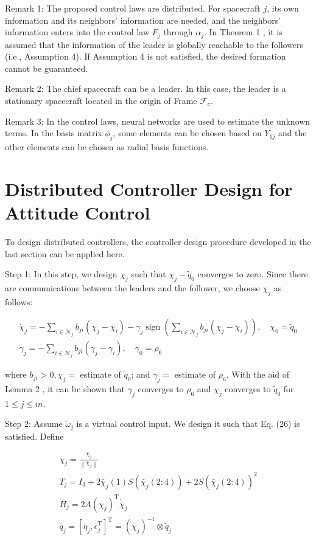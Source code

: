 \documentclass[10pt]{article}
\begin{document}
Remark 1: The proposed control laws are distributed. For spacecraft $j$, its own information and its neighbors' information are needed, and the neighbors' information enters into the control law $F_{j}$ through $\alpha_{j}$. In Theorem 1 , it is assumed that the information of the leader is globally reachable to the followers (i.e., Assumption 4). If Assumption 4 is not satisfied, the desired formation cannot be guaranteed.

Remark 2: The chief spacecraft can be a leader. In this case, the leader is a stationary spacecraft located in the origin of Frame $\mathcal{F}_{c}$.

Remark 3: In the control laws, neural networks are used to estimate the unknown terms. In the basis matrix $\phi_{j}$, some elements can be chosen based on $Y_{1 j}$ and the other elements can be chosen as radial basis functions.

\section{Distributed Controller Design for Attitude Control}
To design distributed controllers, the controller design procedure developed in the last section can be applied here.

Step 1: In this step, we design $\chi_{j}$ such that $\chi_{j}-\tilde{q}_{0}$ converges to zero. Since there are communications between the leaders and the follower, we choose $\chi_{j}$ as follows:

$$
\begin{gathered}
\dot{\chi}_{j}=-\sum_{i \in \mathcal{N}_{j}} b_{j i}\left(\chi_{j}-\chi_{i}\right)-\gamma_{j} \operatorname{sign}\left(\sum_{i \in \mathcal{N}_{j}} b_{j i}\left(\chi_{j}-\chi_{i}\right)\right), \quad \chi_{0}=\tilde{q}_{0} \\
\dot{\gamma}_{j}=-\sum_{i \in \mathcal{N}_{j}} b_{j i}\left(\gamma_{j}-\gamma_{i}\right), \quad \gamma_{0}=\rho_{6}
\end{gathered}
$$

where $b_{j i}>0, \chi_{j}=$ estimate of $\tilde{q}_{0}$; and $\gamma_{j}=$ estimate of $\rho_{6}$. With the aid of Lemma 2 , it can be shown that $\gamma_{j}$ converges to $\rho_{6}$ and $\chi_{j}$ converges to $\tilde{q}_{0}$ for $1 \leq j \leq m$.

Step 2: Assume $\tilde{\omega}_{j}$ is a virtual control input. We design it such that Eq. (26) is satisfied. Define

$$
\begin{gathered}
\bar{\chi}_{j}=\frac{\chi_{j}}{\left\|\chi_{j}\right\|} \\
T_{j}=I_{3}+2 \bar{\chi}_{j}(1) S\left(\bar{\chi}_{j}(2: 4)\right)+2 S\left(\bar{\chi}_{j}(2: 4)\right)^{2} \\
H_{j}=2 A\left(\bar{\chi}_{j}\right)^{\mathrm{T}} \dot{\bar{\chi}}_{j} \\
\bar{q}_{j}=\left[\bar{\eta}_{j}, \bar{\epsilon}_{j}^{\mathrm{T}}\right]^{\mathrm{T}}=\left(\bar{\chi}_{j}\right)^{-1} \otimes \tilde{q}_{j}
\end{gathered}
$$
\end{document}
